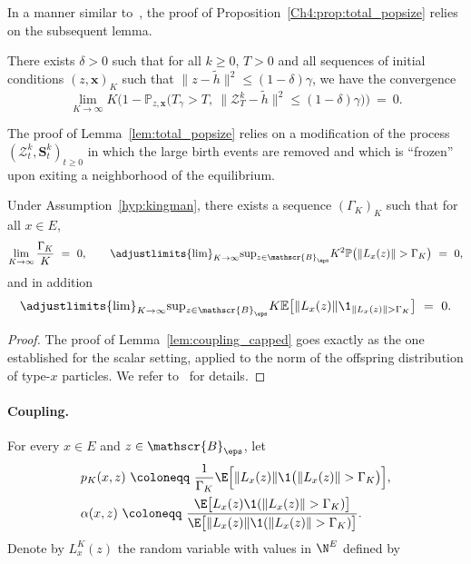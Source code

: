 \begin{refsegment}
In a manner similar to~\citet[Proposition~3.1]{AFRS_2025}, the proof of Proposition~\ref{Ch4:prop:total_popsize} relies on the subsequent lemma.
\begin{lem}\label{lem:total_popsize}
   There exists $\delta > 0$ such that for all $k\geq 0$, $T>0$ and all sequences of initial conditions $(z, \bm x)_K$ such that $\lVert z - \tilde h\rVert^2 \leq (1-\delta)\gamma$, we have the convergence
\[
\lim_{K\to\infty} K\Big(1- \mathbb{P}_{z,\bm x}\big(  T_\gamma > T,\ \lVert \mathcal{Z}^k_T - \tilde h\rVert^2 \leq (1-\delta)\gamma\big)\Big)\ =\ 0.
\]
\end{lem} 
The proof of Lemma~\ref{lem:total_popsize}  relies on a modification of the process $(\mathcal{Z}^k_t, \bm S^k_t)_{t \geq 0}$ in which
    the large birth events are removed and which is ``frozen'' upon
    exiting a neighborhood of the equilibrium. 


\begin{lem}\label{lem:coupling_capped}
    Under Assumption~\ref{hyp:kingman}, there exists a sequence
    $(\Gamma_K)_K$ such that for all $x\in E$, 
    \[
        \lim_{K \to \infty} \frac{\Gamma_K}{K}\ =\ 0,
        \qquad
        \adjustlimits{\lim}_{K \to \infty}{\sup}_{z\in \mathscr{B}_{\eps}} 
        K^2 \mathbb{P}\big( \lVert L_x(z)\rVert > \Gamma_K\big)\ =\ 0,
    \]
and in addition
\[
\adjustlimits{\lim}_{K \to \infty}{\sup}_{z\in \mathscr{B}_{\eps}} 
        K  \mathbb{E}\big[\lVert L_x(z)\rVert \1_{\lVert L_x(z)\rVert > \Gamma_K}\big]\ =\ 0.
\]
\end{lem}
\begin{proof}
The proof of Lemma~\ref{lem:coupling_capped} goes exactly as the one established for the scalar setting, applied to the norm of the offspring distribution of type-$x$ particles. We refer to~\citet[Lemma~3.3]{AFRS_2025} for details. 
\end{proof}

\paragraph{Coupling.}
\begin{lem}\label{lem:truncation_reproduction}
For every $x\in E$ and $z\in\mathscr{B}_{\eps}$, let
\begin{align*}
 & p_K(x,z)\ \coloneqq\ \frac{1}{\Gamma_K} \E\Big[\lVert L_x(z)\rVert \1\big(\lVert L_x(z)\rVert > \Gamma_K \big)\Big], \\
&\alpha(x,z)\ \coloneqq\ \frac{\E\big[ L_x(z) \1(\lVert L_x(z)\rVert > \Gamma_K )\big] }{\E\big[\lVert L_x(z)\rVert \1(\lVert L_x(z)\rVert > \Gamma_K )\big] }.
\end{align*}
Denote by $L^K_x(z)$ the random variable with values in $\N^E$ defined by


\end{lem}
\end{refsegment}
